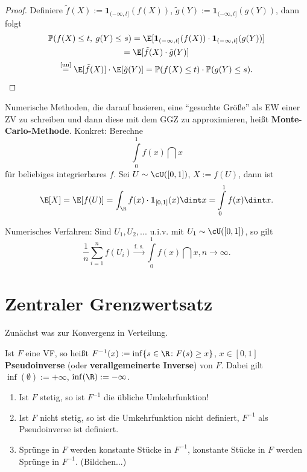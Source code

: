\begin{proof} 
	Definiere $\tilde{f}(X) := \mathbf{1}_{(-\infty,t]}(f(X))$, $\tilde{g}(Y) := \mathbf{1}_{(-\infty,t]}(g(Y))$, dann folgt
	\begin{gather*}
		\mathbb{P}(f(X) \leq t, \: g(Y) \leq s) = \E[\mathbf{1}_{(-\infty,t]}(f(X)) \cdot \mathbf{1}_{(-\infty,t]}(g(Y))]\\ = \E[\tilde{f}(X) \cdot \tilde{g}(Y)]\\
		\overset{\text{\ref{un}}}{=} \E[\tilde{f}(X)] \cdot \E[\tilde{g}(Y)] = \mathbb{P}(f(X) \leq t) \cdot \mathbb{P}(g(Y) \leq s).\\
	\end{gather*}
\end{proof}

\begin{beispiel}
	Numerische Methoden, die darauf basieren, eine \enquote{gesuchte Größe} als EW einer ZV zu schreiben und dann diese mit dem GGZ zu approximieren, heißt \textbf{Monte-Carlo-Methode}. Konkret: Berechne \[ \int\limits_{0}^{1} f(x) \dint x \]
	für beliebiges integrierbares $f$. Sei $U \sim \cU([0,1])$, $X := f(U)$, dann ist \[ \E[X] = \E[f(U)] = \int_{\R} f(x) \cdot \mathbf{1}_{[0,1]}(x) \dint x = \int\limits_{0}^{1} f(x) \dint x. \]
	
	Numerisches Verfahren: Sind $U_1,U_2,...$ u.i.v. mit $U_1 \sim \cU([0,1])$, so gilt \[ \frac{1}{n} \sum\limits_{i=1}^{n} f(U_i) \overset{\text{f. s.}}{\longrightarrow} \int\limits_{0}^{1} f(x) \dint x, n \to \infty. \]
\end{beispiel}

\section{Zentraler Grenzwertsatz}

Zunächst was zur Konvergenz in Verteilung.

\begin{deff}
	Ist $F$ eine VF, so heißt $F^{-1}(x) := \inf\{ s \in \R \colon F(s) \geq x \}$, $x \in [0,1]$ \textbf{Pseudoinverse} (oder \textbf{verallgemeinerte Inverse}) von $F$. Dabei gilt $\inf(\emptyset) := +\infty$, $\inf(\R) := -\infty$.
\end{deff}

\begin{bem1}\abs
	\begin{enumerate}[label=(\roman*)]
		\item Ist $F$ stetig, so ist $F^{-1}$ die übliche Umkehrfunktion!
		\item Ist $F$ nicht stetig, so ist die Umkehrfunktion nicht definiert, $F^{-1}$ als Pseudoinverse ist definiert.
		\item Sprünge in $F$ werden konstante Stücke in $F^{-1}$, konstante Stücke in $F$ werden Sprünge in $F^{-1}$. (Bildchen...)
	\end{enumerate}
\end{bem1}

